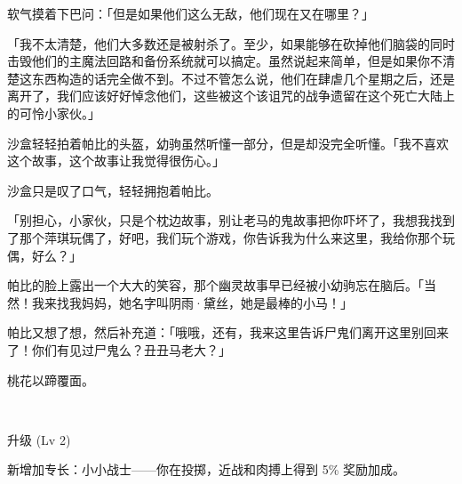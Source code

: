 软气摸着下巴问：「但是如果他们这么无敌，他们现在又在哪里？」

「我不太清楚，他们大多数还是被射杀了。至少，如果能够在砍掉他们脑袋的同时击毁他们的主魔法回路和备份系统就可以搞定。虽然说起来简单，但是如果你不清楚这东西构造的话完全做不到。不过不管怎么说，他们在肆虐几个星期之后，还是离开了，我们应该好好悼念他们，这些被这个该诅咒的战争遗留在这个死亡大陆上的可怜小家伙。」

沙盒轻轻拍着帕比的头盔，幼驹虽然听懂一部分，但是却没完全听懂。「我不喜欢这个故事，这个故事让我觉得很伤心。」

沙盒只是叹了口气，轻轻拥抱着帕比。

「别担心，小家伙，只是个枕边故事，别让老马的鬼故事把你吓坏了，我想我找到了那个萍琪玩偶了，好吧，我们玩个游戏，你告诉我为什么来这里，我给你那个玩偶，好么？」

帕比的脸上露出一个大大的笑容，那个幽灵故事早已经被小幼驹忘在脑后。「当然！我来找我妈妈，她名字叫阴雨·黛丝，她是最棒的小马！」

帕比又想了想，然后补充道：「哦哦，还有，我来这里告诉尸鬼们离开这里别回来了！你们有见过尸鬼么？丑丑马老大？」

桃花以蹄覆面。

~\vfill

\begin{note}
    升级 (Lv 2)

    新增加专长：小小战士——你在投掷，近战和肉搏上得到 5\% 奖励加成。
\end{note}



